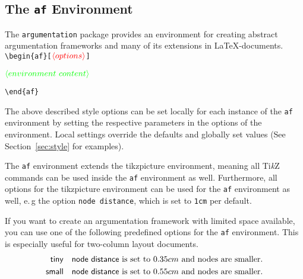 \documentclass{article}
\newcommand{\tikzname}{Ti\emph{k}Z\xspace}
\newcommand{\argumentation}{\texttt{argumentation}\xspace}
\newcommand{\opt}[2][red]{\ensuremath{\textcolor{#1}{\langle #2\rangle}}}
\newtheorem{example}{Example}
\begin{document}
\subsection{The \texttt{af} Environment}\label{sec:af}
The \argumentation package provides an environment for creating abstract argumentation frameworks and many of its extensions in \LaTeX-documents.\\

\vspace{-0.2cm}
\noindent
\verb|\begin{af}[|\opt{options}\verb|]|

\opt[green]{environment~content}

\noindent
\verb|\end{af}|

\begin{list}{}{\leftmargin=\parindent\rightmargin=0pt}
    \item
    The above described style options can be set locally for each instance of the \texttt{af} environment by setting the respective parameters in the options of the environment.
    Local settings override the defaults and globally set values (See Section~\ref{sec:style} 
 for examples).
    
    The \texttt{af} environment extends the \textsf{tikzpicture} environment, meaning all \tikzname commands can be used inside the \texttt{af} environment as well.
    Furthermore, all options for the \textsf{tikzpicture} environment can be used for the \texttt{af} environment as well, e.\,g the option \verb|node distance|, which is set to \verb|1cm| per default.

    If you want to create an argumentation framework with limited space available, you can use one of the following predefined options for the \texttt{af} environment. 
    This is especially useful for two-column layout documents.
    \begin{align*}
        \mathsf{tiny} &\quad \text{\textsf{node distance} is set to $0.35cm$ and nodes are smaller.}\\
        \mathsf{small} &\quad \text{\textsf{node distance} is set to $0.55cm$ and nodes are smaller.}
    \end{align*}

\end{list}
\end{document}
